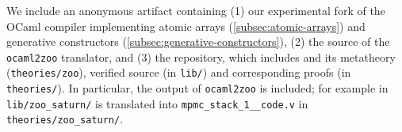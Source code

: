 We include an anonymous artifact containing (1) our experimental fork of the OCaml compiler implementing atomic arrays (\cref{subsec:atomic-arrays}) and generative constructors (\cref{subsec:generative-constructors}), (2) the source of the \texttt{ocaml2zoo} translator, and (3) the \Zoo repository, which includes \ZooLang and its metatheory (\texttt{theories/zoo}), verified \OCaml source (in \texttt{lib/}) and corresponding proofs (in \texttt{theories/}).
In particular, the output of \texttt{ocaml2zoo} is included; for example  in \texttt{lib/zoo\_saturn/} is translated into \texttt{mpmc\_stack\_1\_\_code.v} in \texttt{theories/zoo\_saturn/}.

